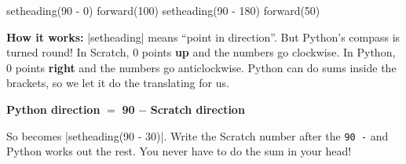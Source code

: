 \begin{tcbraster}[raster columns=2, raster equal height=rows, raster column skip=12pt, raster valign=center]
\begin{tcolorbox}[colback=white, colframe=white, boxrule=0pt, valign=center]
\begin{scratch}
\end{scratch}
\end{tcolorbox}
\begin{code}
setheading(90 - 0)
forward(100)
setheading(90 - 180)
forward(50)
\end{code}
\end{tcbraster}

\textbf{How it works:} \py|setheading| means ``point in direction''. But Python's compass is turned round! In Scratch, 0 points \textbf{up} and the numbers go clockwise. In Python, 0 points \textbf{right} and the numbers go anticlockwise. Python can do sums inside the brackets, so we let it do the translating for us.

\begin{center}
\end{center}

\begin{think}
\begin{center}\textbf{Python direction} $=$ \textbf{90} $-$ \textbf{Scratch direction}\end{center}
So  becomes \py|setheading(90 - 30)|. Write the Scratch number after the \texttt{90 -} and Python works out the rest. You never have to do the sum in your head!
\end{think}

